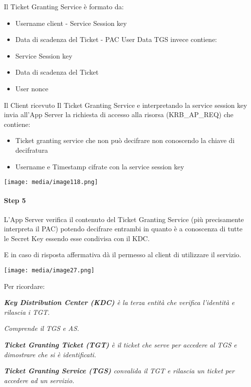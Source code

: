 Il Ticket Granting Service è formato da:

\begin{itemize}
\item
  Username client - Service Session key
\item
  Data di scadenza del Ticket - PAC User Data TGS invece contiene:
\item
  Service Session key
\item
  Data di scadenza del Ticket
\item
  User nonce
\end{itemize}

Il Client ricevuto Il Ticket Granting Service e interpretando la service
session key invia all'App Server la richiesta di accesso alla risorsa
(KRB\_AP\_REQ) che contiene:

\begin{itemize}
\item
  Ticket granting service che non può decifrare non conoscendo la chiave
  di decifratura
\item
  Username e Timestamp cifrate con la service session key
\end{itemize}

\texttt{[image: media/image118.png]}

\paragraph{Step 5}\label{step-5}

L'App Server verifica il contenuto del Ticket Granting Service (più
precisamente interpreta il PAC) potendo decifrare entrambi in quanto è a
conoscenza di tutte le Secret Key essendo esse condivisa con il KDC.

E in caso di risposta affermativa dà il permesso al client di utilizzare
il servizio.

\texttt{[image: media/image27.png]}

Per ricordare:

\emph{\textbf{Key Distribution Center (KDC)} è la terza entità che
verifica l'identità e rilascia i TGT.}

\emph{Comprende il TGS e AS.}

\emph{\textbf{Ticket Granting Ticket (TGT)} è il ticket che serve per
accedere al TGS e dimostrare che si è identificati.}

\emph{\textbf{Ticket Granting Service (TGS)} convalida il TGT e rilascia
un ticket per accedere ad un servizio.}

